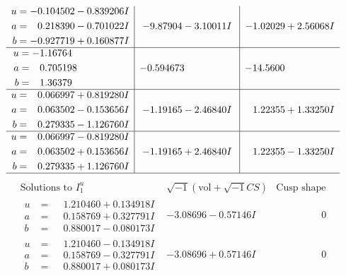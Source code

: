 \documentclass[1p]{elsarticle_modified}
\theoremstyle{definition}
\newcommand{\I}{\sqrt{-1}}
\begin{document}
$$\begin{array}{c|c|c}
\begin{aligned}
u &= -0.104502 - 0.839206 I \\
a &= \phantom{-}0.218390 - 0.701022 I \\
b &= -0.927719 + 0.160877 I\end{aligned}
 & -9.87904 - 3.10011 I & -1.02029 + 2.56068 I \\ \hline\begin{aligned}
u &= -1.16764\phantom{ +0.000000I} \\
a &= \phantom{-}0.705198\phantom{ +0.000000I} \\
b &= \phantom{-}1.36379\phantom{ +0.000000I}\end{aligned}
 & -0.594673\phantom{ +0.000000I} & -14.5600\phantom{ +0.000000I} \\ \hline\begin{aligned}
u &= \phantom{-}0.066997 + 0.819280 I \\
a &= \phantom{-}0.063502 - 0.153656 I \\
b &= \phantom{-}0.279335 - 1.126760 I\end{aligned}
 & -1.19165 - 2.46840 I & \phantom{-}1.22355 + 1.33250 I \\ \hline\begin{aligned}
u &= \phantom{-}0.066997 - 0.819280 I \\
a &= \phantom{-}0.063502 + 0.153656 I \\
b &= \phantom{-}0.279335 + 1.126760 I\end{aligned}
 & -1.19165 + 2.46840 I & \phantom{-}1.22355 - 1.33250 I\\
 \hline 
 \end{array}$$\newpage$$\begin{array}{c|c|c}  
\text{Solutions to }I^u_{1}& \I (\text{vol} + \sqrt{-1}CS) & \text{Cusp shape}\\
 \hline 
\begin{aligned}
u &= \phantom{-}1.210460 + 0.134918 I \\
a &= \phantom{-}0.158769 + 0.327791 I \\
b &= \phantom{-}0.880017 - 0.080173 I\end{aligned}
 & -3.08696 - 0.57146 I & \phantom{-0.000000 } 0 \\ \hline\begin{aligned}
u &= \phantom{-}1.210460 - 0.134918 I \\
a &= \phantom{-}0.158769 - 0.327791 I \\
b &= \phantom{-}0.880017 + 0.080173 I\end{aligned}
 & -3.08696 + 0.57146 I & \phantom{-0.000000 } 0 \\ \hline\begin{aligned}

\end{aligned}
\end{array}$$
\end{document}
